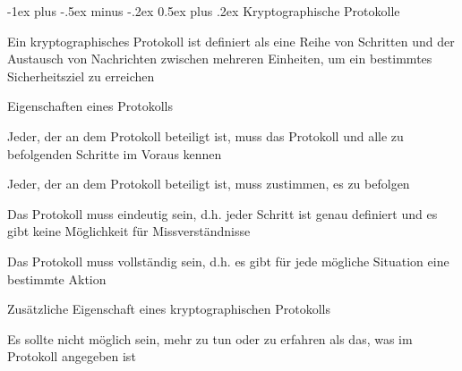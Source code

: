 \documentclass[a4paper]{article}
\makeatletter
\renewcommand{\section}{\@startsection{section}{1}{0mm}%
 {-1ex plus -.5ex minus -.2ex}%
 {0.5ex plus .2ex}%
 {\normalfont\large\bfseries}}
\makeatother
\begin{document}
\begin{multicols}{3}
      \section{Kryptographische Protokolle}
      \begin{itemize*}
            \item Ein kryptographisches Protokoll ist definiert als eine Reihe von Schritten und der Austausch von Nachrichten zwischen mehreren Einheiten, um ein bestimmtes Sicherheitsziel zu erreichen
            \item Eigenschaften eines Protokolls
            \begin{itemize*}
                  \item Jeder, der an dem Protokoll beteiligt ist, muss das Protokoll und alle zu befolgenden Schritte im Voraus kennen
                  \item Jeder, der an dem Protokoll beteiligt ist, muss zustimmen, es zu befolgen
                  \item Das Protokoll muss eindeutig sein, d.h. jeder Schritt ist genau definiert und es gibt keine Möglichkeit für Missverständnisse
                  \item Das Protokoll muss vollständig sein, d.h. es gibt für jede mögliche Situation eine bestimmte Aktion
            \end{itemize*}
            \item Zusätzliche Eigenschaft eines kryptographischen Protokolls
            \begin{itemize*}
                  \item Es sollte nicht möglich sein, mehr zu tun oder zu erfahren als das, was im Protokoll angegeben ist
            \end{itemize*}
      \end{itemize*}


\end{multicols}
\end{document}
